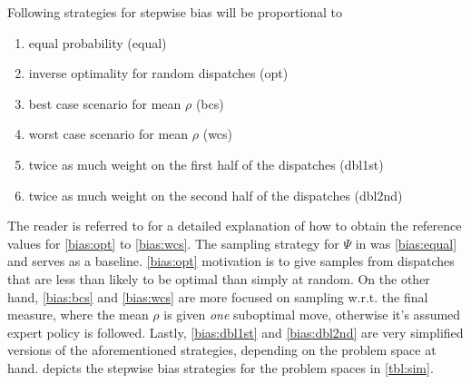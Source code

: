Following strategies for stepwise bias will be proportional to
\begin{enumerate}[after={{}}, leftmargin=*,
    label={\textbf{Bias.\arabic*}}, ref={{Bias.\arabic*}}]
    \item \label{bias:equal} equal probability (equal) 
    \item \label{bias:opt} inverse optimality for random dispatches (opt) 
    \item \label{bias:bcs} best case scenario for mean $\rho$ (bcs)
    \item \label{bias:wcs} worst case scenario for mean $\rho$ (wcs)
    \item \label{bias:dbl1st} twice as much weight on the first half of the 
    dispatches (dbl1st) 
    \item \label{bias:dbl2nd} twice as much weight on the second half of the 
    dispatches (dbl2nd)
\end{enumerate}
The reader is referred to \cite{InRu15b} for a detailed explanation of how to 
obtain the reference values for \ref{bias:opt} to \ref{bias:wcs}.
The sampling strategy for $\Psi$ in \cite{InRu11a,InRu15b} was \ref{bias:equal} 
and serves as a baseline. \ref{bias:opt} motivation is to give 
samples from dispatches that are less than likely to be optimal than simply at 
random. On the other hand, \ref{bias:bcs} and \ref{bias:wcs} are more focused 
on sampling w.r.t. the final measure, where the mean $\rho$ is given \emph{one} 
suboptimal move, otherwise it's assumed expert policy is followed. 
Lastly, \ref{bias:dbl1st} and \ref{bias:dbl2nd} are very simplified versions of 
the aforementioned strategies, depending on the problem space at hand. 
 depicts the stepwise bias strategies for the problem spaces in 
\cref{tbl:sim}.

